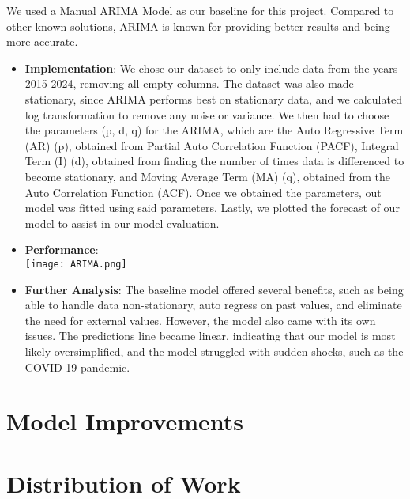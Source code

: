 \documentclass[conference]{IEEEtran}
\begin{document}
We used a Manual ARIMA Model as our baseline for this project. Compared to other known solutions, ARIMA is known for providing better results and being more accurate. 

\begin{itemize}

    \item \textbf{Implementation}: We chose our dataset to only include data from the years 2015-2024, removing all empty columns. The dataset was also made stationary, since ARIMA performs best on stationary data, and we calculated log transformation to remove any noise or variance. We then had to choose the parameters (p, d, q) for the ARIMA, which are the Auto Regressive Term (AR) (p), obtained from Partial Auto Correlation Function (PACF), Integral Term (I) (d), obtained from finding the number of times data is differenced to become stationary, and Moving Average Term (MA) (q), obtained from the Auto Correlation Function (ACF). Once we obtained the parameters, out model was fitted using said parameters. Lastly, we plotted the forecast of our model to assist in our model evaluation.    


    \item \textbf{Performance}:  \\
    \texttt{[image: ARIMA.png]} %

    \item \textbf{Further Analysis}:
    The baseline model offered several benefits, such as being able to handle data non-stationary, auto regress on past values, and eliminate the need for external values. However, the model also came with its own issues. The predictions line became linear, indicating that our model is most likely oversimplified, and the model struggled with sudden shocks, such as the COVID-19 pandemic.

\end{itemize}

\section{Model Improvements}

\section{Distribution of Work}
\end{document}

